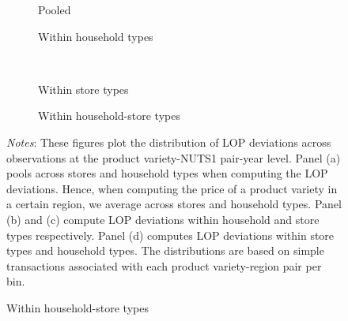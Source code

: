  \begin{figure}[H]
    \centering
    \caption{LOP deviations - Transaction weighted}
    \label{fig: app_redform_dp_w}
    \begin{subfigure}[t]{.49\textwidth}
         \centering
         \caption{Pooled}
         \scalebox{0.45}{}
     \end{subfigure}
     \begin{subfigure}[t]{.49\textwidth}
         \centering
         \caption{Within household types}
         \scalebox{0.45}{}
     \end{subfigure}\\
     \begin{subfigure}[t]{.49\textwidth}
         \centering
         \caption{Within store types}
         \scalebox{0.45}{}
     \end{subfigure}
     \begin{subfigure}[t]{.49\textwidth}
         \centering
         \caption{Within household-store types}
         \scalebox{0.45}{}
     \end{subfigure}
     \parbox{\textwidth}{
        \begin{spacing}{1} 
            {\footnotesize 
            \textit{Notes}: These figures plot the distribution of LOP deviations across observations at the product variety-NUTS1 pair-year level. Panel (a) pools across stores and household types when computing the LOP deviations. Hence, when computing the price of a product variety in a certain region, we average across stores and household types. Panel (b) and (c) compute LOP deviations within household and store types respectively. Panel (d) computes LOP deviations within store types and household types. The distributions are based on simple transactions associated with each product variety-region pair per bin.}
        \end{spacing}}
 \end{figure} 

